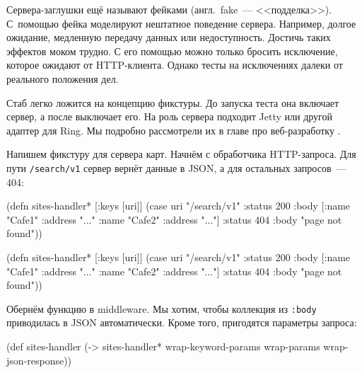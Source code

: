 
Сервера-заглушки ещё называют фейками (англ.~fake~--- <<подделка>>). С~помощью
фейка моделируют нештатное поведение сервера. Например, долгое ожидание,
медленную передачу данных или недоступность. Достичь таких эффектов моком
трудно. С его помощью можно только бросить исключение, которое ожидают от
HTTP-клиента. Однако тесты на исключениях далеки от реального положения дел.

Стаб легко ложится на концепцию фикстуры. До запуска теста она включает сервер,
а после выключает его. На роль сервера подходит Jetty или другой адаптер для
Ring. Мы подробно рассмотрели их в главе про веб-разработку .

Напишем фикстуру для сервера карт. Начнём с обработчика HTTP-запроса. Для пути
\verb|/search/v1| сервер вернёт данные в JSON, а для остальных запросов~--- 404:

\label{sites-handler}

\ifnarrow

\begin{english}
  \begin{clojure}
(defn sites-handler* [{:keys [uri]}]
  (case uri
    "/search/v1"
    {:status 200
     :body [{:name "Cafe1"
             :address "..."}
            {:name "Cafe2"
             :address "..."}]}
    {:status 404
     :body "page not found"}))
  \end{clojure}
\end{english}

\else

\begin{english}
  \begin{clojure}
(defn sites-handler* [{:keys [uri]}]
  (case uri
    "/search/v1"
    {:status 200 :body [{:name "Cafe1" :address "..."}
                        {:name "Cafe2" :address "..."}]}
    {:status 404 :body "page not found"}))
  \end{clojure}
\end{english}

\fi


Обернём функцию в middleware. Мы хотим, чтобы коллекция из \verb|:body|
приводилась в JSON автоматически. Кроме того, пригодятся параметры запроса:

\begin{english}
  \begin{clojure}
(def sites-handler
  (-> sites-handler*
      wrap-keyword-params
      wrap-params
      wrap-json-response))
  \end{clojure}
\end{english}

